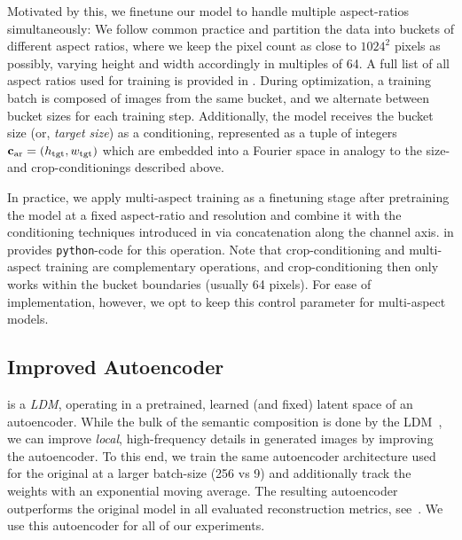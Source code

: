 \documentclass{article}
\begin{document}
Motivated by this, we finetune our model to handle multiple aspect-ratios simultaneously: We follow common practice \cite{novelai2023novelai} and partition the data into buckets of different aspect ratios, where we keep the pixel count as close to $1024^2$ pixels as possibly, varying height and width accordingly in multiples of 64. A full list of all aspect ratios used for training is provided in . During optimization, a training batch is composed of images from the same bucket, and we alternate between bucket sizes for each training step. Additionally, the model receives the bucket size (or, \emph{target size}) as a conditioning, represented as a tuple of integers $\mathbf{c}_{\text{ar}}=(h_{\text{tgt}}, w_{\text{tgt}})$ which are embedded into a Fourier space in analogy to the size- and crop-conditionings described above.%

In practice, we apply multi-aspect training as a finetuning stage after pretraining the model at a fixed aspect-ratio and resolution and combine it with the conditioning techniques introduced in  via concatenation along the channel axis.  in  provides \verb|python|-code for this operation. Note that crop-conditioning and multi-aspect training are complementary operations, and crop-conditioning then only works within the bucket boundaries (usually 64 pixels). For ease of implementation, however, we opt to keep this control parameter for multi-aspect models.

\subsection{Improved Autoencoder}
\label{subsec:ae}
\aecomp
\sd is a \emph{LDM}, operating in a pretrained, learned (and fixed) latent space of an autoencoder. While the bulk of the semantic composition is done by the LDM~\cite{rombach2021high}, we can improve \emph{local}, high-frequency details in generated images by improving the autoencoder. To this end, we train the same autoencoder architecture used for the original \sd at a larger batch-size (256 vs 9) and additionally track the weights with an exponential moving average. The resulting autoencoder outperforms the original model in all evaluated reconstruction metrics, see~. We use this autoencoder for all of our experiments.

%
%
%
%
%
\end{document}
